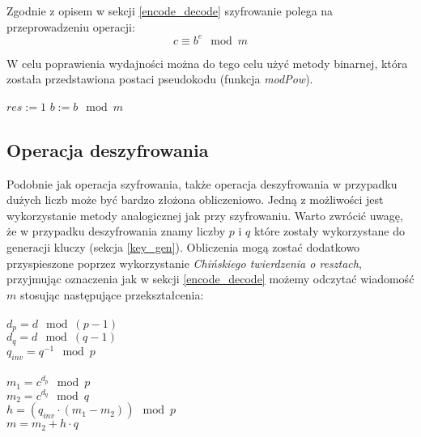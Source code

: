 \documentclass[10pt,a4paper]{article}
\begin{document}
Zgodnie z opisem w sekcji \ref{encode_decode} szyfrowanie polega na przeprowadzeniu operacji:
\begin{equation}
c \equiv b^e \mod m
\end{equation}

W celu poprawienia wydajności można do tego celu użyć metody binarnej, która została przedstawiona postaci pseudokodu (funkcja \textit{modPow}).


\begin{algorithm} \label{fun_modPow}
\begin{algorithmic}[1]
\EndIf

\State $res := 1$
\State $b := b \mod m$
	\EndIf
\EndWhile

\State {}
\EndFunction
\end{algorithmic}
\end{algorithm}

\subsection{Operacja deszyfrowania}

Podobnie jak operacja szyfrowania, także operacja deszyfrowania w przypadku dużych liczb może być bardzo złożona obliczeniowo. Jedną z możliwości jest wykorzystanie metody analogicznej jak przy szyfrowaniu. Warto zwrócić uwagę, że w przypadku deszyfrowania znamy liczby $p$ i $q$ które zostały wykorzystane do generacji kluczy (sekcja \ref{key_gen}). Obliczenia mogą zostać dodatkowo przyspieszone poprzez wykorzystanie \textit{Chińskiego twierdzenia o resztach}, przyjmując oznaczenia jak w sekcji \ref{encode_decode} możemy odczytać wiadomość $m$ stosując następujące przekształcenia:\\
\\
$d_p = d \mod (p-1)$\\ 
$d_q = d \mod (q-1)$\\
$q_{inv} = q^{-1} \mod p$\\ \\ 
$m_1 = c^{d_p} \mod p$\\
$m_2 = c^{d_q} \mod q$\\
$h = (q_{inv} \cdot (m_1 - m_2)) \mod p$\\
$m = m_2 + h \cdot q$\\
\end{document}
